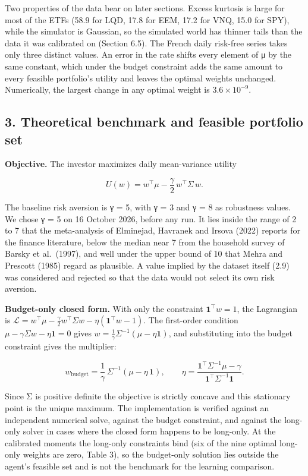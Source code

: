\documentclass[
  11pt]{article}
\begin{document}
Two properties of the data bear on later sections. Excess kurtosis is
large for most of the ETFs (58.9 for LQD, 17.8 for EEM, 17.2 for VNQ,
15.0 for SPY), while the simulator is Gaussian, so the simulated world
has thinner tails than the data it was calibrated on (Section 6.5). The
French daily risk-free series takes only three distinct values. An error
in the rate shifts every element of μ by the same constant, which under
the budget constraint adds the same amount to every feasible portfolio's
utility and leaves the optimal weights unchanged. Numerically, the
largest change in any optimal weight is \(3.6 \times 10^{-9}\).

\subsection{3. Theoretical benchmark and feasible portfolio
set}\label{theoretical-benchmark-and-feasible-portfolio-set}

\textbf{Objective.} The investor maximizes daily mean-variance utility

\[U(w) = w^\top \mu - \frac{\gamma}{2}\, w^\top \Sigma\, w .\]

The baseline risk aversion is γ = 5, with γ = 3 and γ = 8 as robustness
values. We chose γ = 5 on 16 October 2026, before any run. It lies
inside the range of 2 to 7 that the meta-analysis of Elminejad, Havranek
and Irsova (2022) reports for the finance literature, below the median
near 7 from the household survey of Barsky et al.~(1997), and well under
the upper bound of 10 that Mehra and Prescott (1985) regard as
plausible. A value implied by the dataset itself (2.9) was considered
and rejected so that the data would not select its own risk aversion.

\textbf{Budget-only closed form.} With only the constraint
\(\mathbf{1}^\top w = 1\), the Lagrangian is
\(\mathcal{L} = w^\top\mu - \tfrac{\gamma}{2} w^\top \Sigma w - \eta(\mathbf{1}^\top w - 1)\).
The first-order condition
\(\mu - \gamma \Sigma w - \eta \mathbf{1} = 0\) gives
\(w = \tfrac{1}{\gamma}\Sigma^{-1}(\mu - \eta \mathbf{1})\), and
substituting into the budget constraint gives the multiplier:

\[w_{\text{budget}} = \frac{1}{\gamma}\,\Sigma^{-1}\left(\mu - \eta\,\mathbf{1}\right), \qquad \eta = \frac{\mathbf{1}^\top \Sigma^{-1}\mu - \gamma}{\mathbf{1}^\top \Sigma^{-1}\mathbf{1}} .\]

Since Σ is positive definite the objective is strictly concave and this
stationary point is the unique maximum. The implementation is verified
against an independent numerical solve, against the budget constraint,
and against the long-only solver in cases where the closed form happens
to be long-only. At the calibrated moments the long-only constraints
bind (six of the nine optimal long-only weights are zero, Table 3), so
the budget-only solution lies outside the agent's feasible set and is
not the benchmark for the learning comparison.
\end{document}
